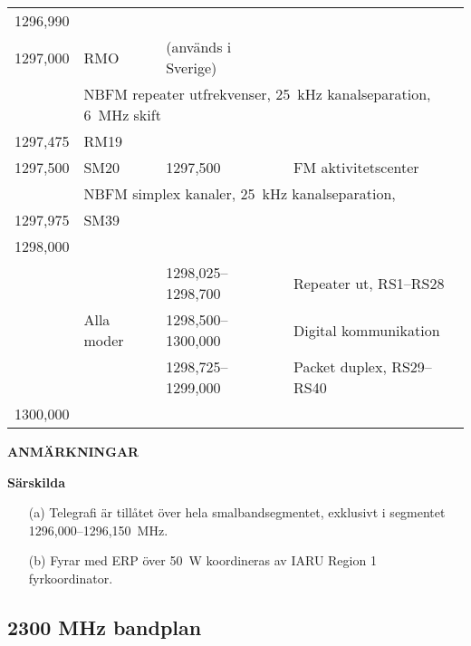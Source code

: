 \begin{longtable}{llll}
1296,990 & & & \\
1297,000 & RMO & (används i Sverige) & \\
         & \multicolumn{3}{l}{NBFM repeater utfrekvenser, 25~kHz kanalseparation, 6~MHz skift} \\
1297,475 & RM19 & & \\
1297,500 & SM20 & 1297,500 & FM aktivitetscenter \\
         & \multicolumn{3}{l}{NBFM simplex kanaler, 25~kHz kanalseparation,} \\
1297,975 & SM39 & & \\
1298,000 & & & \\
         &            & 1298,025--1298,700 & Repeater ut, RS1--RS28 \\
         & Alla moder & 1298,500--1300,000 & Digital kommunikation \\
         &            & 1298,725--1299,000 & Packet duplex, RS29--RS40 \\
1300,000 & & & \\
\end{longtable}

\textbf{ANMÄRKNINGAR}

\textbf{Särskilda}

\begin{itemize}
\item[(a)] Telegrafi är tillåtet över hela smalbandsegmentet, exklusivt
i segmentet 1296,000--1296,150~MHz.
\item[(b)] Fyrar med ERP över 50~W koordineras av IARU Region 1 fyrkoordinator.
\end{itemize}

\subsection{2300 MHz bandplan}

